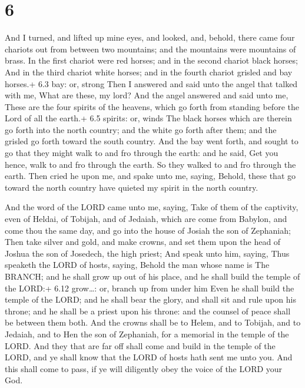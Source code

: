 \hypertarget{section-5}{%
\section{6}\label{section-5}}

 And I turned, and lifted up mine eyes, and looked, and,
behold, there came four chariots out from between two mountains; and the
mountains were mountains of brass.  In the first chariot
were red horses; and in the second chariot black horses; 
And in the third chariot white horses; and in the fourth chariot grisled
and bay horses.+ 6.3 bay: or, strong  Then I answered and
said unto the angel that talked with me, What are these, my lord?
 And the angel answered and said unto me, These are the four
spirits of the heavens, which go forth from standing before the Lord of
all the earth.+ 6.5 spirits: or, winds  The black horses
which are therein go forth into the north country; and the white go
forth after them; and the grisled go forth toward the south country.
 And the bay went forth, and sought to go that they might
walk to and fro through the earth: and he said, Get you hence, walk to
and fro through the earth. So they walked to and fro through the earth.
 Then cried he upon me, and spake unto me, saying, Behold,
these that go toward the north country have quieted my spirit in the
north country.

 And the word of the LORD came unto me, saying,
 Take of them of the captivity, even of Heldai, of Tobijah,
and of Jedaiah, which are come from Babylon, and come thou the same day,
and go into the house of Josiah the son of Zephaniah;  Then
take silver and gold, and make crowns, and set them upon the head of
Joshua the son of Josedech, the high priest;  And speak
unto him, saying, Thus speaketh the LORD of hosts, saying, Behold the
man whose name is The BRANCH; and he shall grow up out of his place, and
he shall build the temple of the LORD:+ 6.12 grow\ldots: or, branch up
from under him  Even he shall build the temple of the LORD;
and he shall bear the glory, and shall sit and rule upon his throne; and
he shall be a priest upon his throne: and the counsel of peace shall be
between them both.  And the crowns shall be to Helem, and
to Tobijah, and to Jedaiah, and to Hen the son of Zephaniah, for a
memorial in the temple of the LORD.  And they that are far
off shall come and build in the temple of the LORD, and ye shall know
that the LORD of hosts hath sent me unto you. And this shall come to
pass, if ye will diligently obey the voice of the LORD your God.

